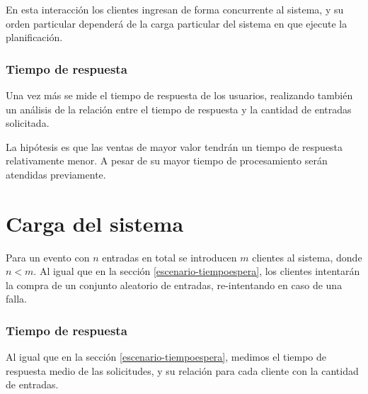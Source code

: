 \begin{figure}
\end{figure}
\begin{figure}
\end{figure}

En esta interacción los clientes ingresan de forma concurrente al sistema, y su orden particular dependerá de la carga
particular del sistema en que ejecute la planificación.

\subsubsection{Tiempo de respuesta}
Una vez más se mide el tiempo de respuesta de los usuarios, realizando también un análisis de la relación entre el tiempo
de respuesta y la cantidad de entradas solicitada.

La hipótesis es que las ventas de mayor valor tendrán un tiempo de respuesta relativamente menor.
A pesar de su mayor tiempo de procesamiento serán atendidas previamente.


\section{Carga del sistema}
Para un evento con \(n\) entradas en total se introducen \(m\) clientes al sistema, donde \(n < m\).
Al igual que en la sección \ref{escenario-tiempoespera}, los clientes intentarán
la compra de un conjunto aleatorio de entradas, re-intentando en caso de una falla.

\subsubsection{Tiempo de respuesta}
Al igual que en la sección \ref{escenario-tiempoespera}, medimos el tiempo de respuesta medio de las solicitudes,
y su relación para cada cliente con la cantidad de entradas.
